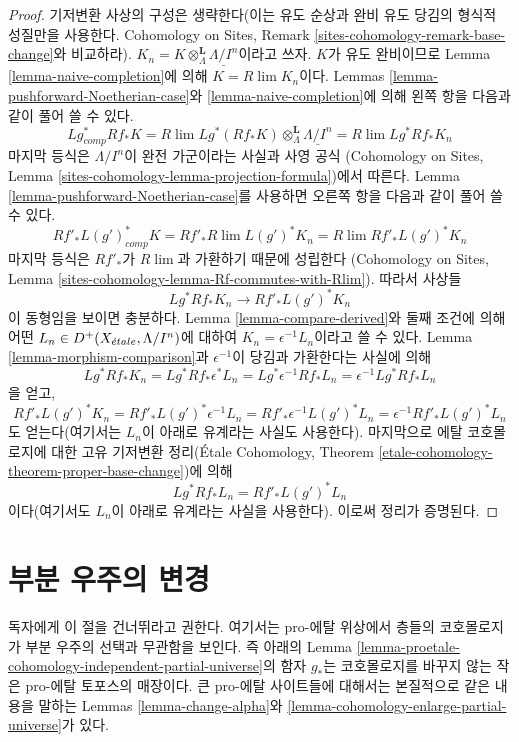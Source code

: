 \begin{proof}
기저변환 사상의 구성은 생략한다(이는 유도 순상과 완비 유도 당김의
형식적 성질만을 사용한다. Cohomology on Sites, Remark
\ref{sites-cohomology-remark-base-change}와 비교하라).
$K_n = K \otimes^\mathbf{L}_\Lambda \underline{\Lambda/I^n}$이라고 쓰자.
$K$가 유도 완비이므로 Lemma \ref{lemma-naive-completion}에 의해
$K = R\lim K_n$이다. Lemmas \ref{lemma-pushforward-Noetherian-case}와
\ref{lemma-naive-completion}에 의해 왼쪽 항을 다음과 같이 풀어 쓸 수
있다.
$$
Lg_{comp}^* Rf_* K =
R\lim Lg^*(Rf_*K)\otimes^\mathbf{L}_\Lambda \underline{\Lambda/I^n} =
R\lim Lg^* Rf_* K_n
$$
마지막 등식은 $\Lambda/I^n$이 완전 가군이라는 사실과 사영 공식
(Cohomology on Sites, Lemma
\ref{sites-cohomology-lemma-projection-formula})에서 따른다. Lemma
\ref{lemma-pushforward-Noetherian-case}를 사용하면 오른쪽 항을 다음과
같이 풀어 쓸 수 있다.
$$
Rf'_* L(g')^*_{comp} K =
Rf'_* R\lim L(g')^* K_n  =
R\lim Rf'_* L(g')^* K_n
$$
마지막 등식은 $Rf'_*$가 $R\lim$과 가환하기 때문에 성립한다
(Cohomology on Sites, Lemma
\ref{sites-cohomology-lemma-Rf-commutes-with-Rlim}). 따라서 사상들
$$
Lg^* Rf_* K_n \longrightarrow Rf'_* L(g')^* K_n
$$
이 동형임을 보이면 충분하다. Lemma \ref{lemma-compare-derived}와 둘째
조건에 의해 어떤 $L_n \in D^+(X_{\acute{e}tale}, \Lambda/I^n)$에 대하여
$K_n = \epsilon^{-1}L_n$이라고 쓸 수 있다. Lemma
\ref{lemma-morphism-comparison}과 $\epsilon^{-1}$이 당김과 가환한다는
사실에 의해
$$
Lg^* Rf_* K_n =
Lg^* Rf_* \epsilon^*L_n =
Lg^* \epsilon^{-1} Rf_* L_n =
\epsilon^{-1} Lg^* Rf_* L_n
$$
을 얻고,
$$
Rf'_* L(g')^* K_n =
Rf'_* L(g')^* \epsilon^{-1} L_n =
Rf'_* \epsilon^{-1} L(g')^* L_n =
\epsilon^{-1} Rf'_* L(g')^* L_n
$$
도 얻는다(여기서는 $L_n$이 아래로 유계라는 사실도 사용한다).
마지막으로 에탈 코호몰로지에 대한 고유 기저변환 정리(\'Etale
Cohomology, Theorem
\ref{etale-cohomology-theorem-proper-base-change})에 의해
$$
Lg^* Rf_* L_n = Rf'_* L(g')^* L_n
$$
이다(여기서도 $L_n$이 아래로 유계라는 사실을 사용한다). 이로써
정리가 증명된다.
\end{proof}






\section{부분 우주의 변경}
\label{section-change-universe}

\noindent
독자에게 이 절을 건너뛰라고 권한다. 여기서는 pro-에탈 위상에서
층들의 코호몰로지가 부분 우주의 선택과 무관함을 보인다. 즉 아래의
Lemma \ref{lemma-proetale-cohomology-independent-partial-universe}의 함자
$g_*$는 코호몰로지를 바꾸지 않는 작은 pro-에탈 토포스의 매장이다.
큰 pro-에탈 사이트들에 대해서는 본질적으로 같은 내용을 말하는
Lemmas \ref{lemma-change-alpha}와
\ref{lemma-cohomology-enlarge-partial-universe}가 있다.

